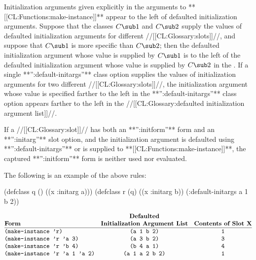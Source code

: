 Initialization arguments given explicitly in the arguments to **[[CL:Functions:make-instance]]** appear to the left of defaulted initialization arguments. Suppose that the classes $C\sub 1$ and $C\sub 2$ supply the values of defaulted initialization arguments for different //[[CL:Glossary:slots]]//, and suppose that $C\sub 1$ is more specific than $C\sub 2$; then the defaulted initialization argument whose value is supplied by $C\sub 1$ is to the left of the defaulted initialization argument whose value is supplied by $C\sub 2$ in the .  If a single **'':default-initargs''** class option supplies the values of initialization arguments for two different //[[CL:Glossary:slots]]//, the initialization argument whose value is specified farther to the left in the **'':default-initargs''** class option appears farther to the left in the //[[CL:Glossary:defaulted initialization argument list]]//.

                                                         If a //[[CL:Glossary:slot]]// has both an **'':initform''** form and an  **'':initarg''** slot option, and the initialization argument is defaulted using **'':default-initargs''** or is supplied to **[[CL:Functions:make-instance]]**, the captured **'':initform''** form is neither used nor evaluated.

The following is an example of the above rules:

\code
 (defclass q () ((x :initarg a)))
 (defclass r (q) ((x :initarg b))
   (:default-initargs a 1 b 2)) \endcode

$$\vbox{\halign{\strut#\hfil&\quad\hfil#\hfil&\quad\hfil#\hfil\cr {}&\bf Defaulted&{}\cr \bf Form&\bf Initialization Argument List&\bf Contents of Slot X\cr \noalign{\hrule} {\tt (make-instance 'r)}&{\tt (a 1 b 2)}&{\tt 1}\cr {\tt (make-instance 'r 'a 3)}&{\tt (a 3 b 2)}&{\tt 3}\cr {\tt (make-instance 'r 'b 4)}&{\tt (b 4 a 1)}&{\tt 4}\cr {\tt (make-instance 'r 'a 1 'a 2)}&{\tt (a 1 a 2 b 2)}&{\tt 1}\cr}}$$

\endsubsection%

